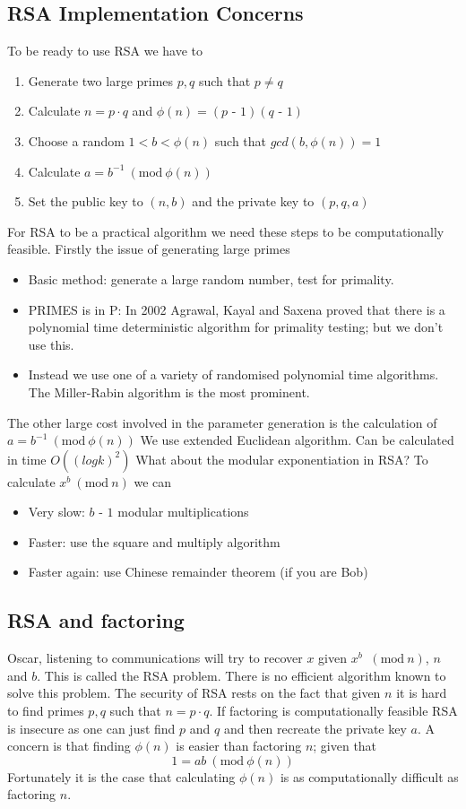 \documentclass{article}
\theoremstyle{quest}
\newcommand{\mns}{\textrm{ -  }}
\newcommand{\Mod}[1]{\ (\mathrm{mod}\ #1)}
\begin{document}
\subsection{RSA Implementation Concerns}
To be ready to use RSA we have to
\begin{enumerate}
    \item Generate two large primes $p, q$ such that $p \neq q$
    \item Calculate $n = p \cdot q$ and $\phi(n) = (p \mns 1) (q \mns 1)$
    \item Choose a random $1 < b < \phi(n)$ such that $gcd(b, \phi(n)) = 1$
    \item Calculate $a = b^{-1} \Mod{\phi(n)}$
    \item Set the public key to $(n, b)$ and the private key to $(p, q, a)$
\end{enumerate}
For RSA to be a practical algorithm we need these steps to be computationally feasible.
Firstly the issue of generating large primes
\begin{itemize}
    \item Basic method: generate a large random number, test for primality.
    \item PRIMES is in P: In 2002 Agrawal, Kayal and Saxena proved that
        there is a polynomial time deterministic algorithm for primality testing; but we don’t use this.
    \item Instead we use one of a variety of randomised polynomial time algorithms. The Miller-Rabin algorithm is the most prominent.
\end{itemize}

The other large cost involved in the parameter generation is the calculation of
$a = b^{-1} \Mod{\phi(n)}$
We use extended Euclidean algorithm.
Can be calculated in time $O((log k)^2)$
What about the modular exponentiation in RSA?
To calculate $x^b \Mod{n}$ we can
\begin{itemize}
    \item Very slow: $b \mns 1$ modular multiplications
    \item Faster: use the square and multiply algorithm
    \item Faster again: use Chinese remainder theorem (if you are Bob)
\end{itemize}

\subsection{RSA and factoring}
Oscar, listening to communications will try to recover $x$ given $x^b$ $\Mod{n}$, $n$ and $b$.
This is called the RSA problem.
There is no efficient algorithm known to solve this problem.
The security of RSA rests on the fact that given $n$
it is hard to find primes $p,q$ such that $n = p \cdot q$.
If factoring is computationally feasible RSA is insecure
as one can just find $p$ and $q$ and then recreate the private key $a$.
A concern is that finding $\phi(n)$ is easier than factoring $n$;
given that $$1 = ab \Mod{\phi(n)}$$
Fortunately it is the case that calculating $\phi(n)$ is as computationally difficult as factoring $n$.
\end{document}
